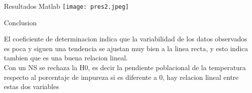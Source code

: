 \documentclass[12pt]{beamer}
\begin{document}
\begin{frame}{Resultados Matlab}
\texttt{[image: pres2.jpeg]} 

\end{frame}

\begin{frame}{Conclusion}

El coeficiente de determinacion indica que la
variabilidad de los datos observados es poca y
siguen una tendencia se ajustan muy bien a la
linea recta, y esto indica tambien que es una
buena relacion lineal.
\\

Con un NS se rechaza la H0, es decir la
pendiente poblacional de la temperatura
respecto al porcentaje de impureza si es
diferente a 0, hay relacion lineal entre estas dos
variables

\end{frame}
\end{document}
